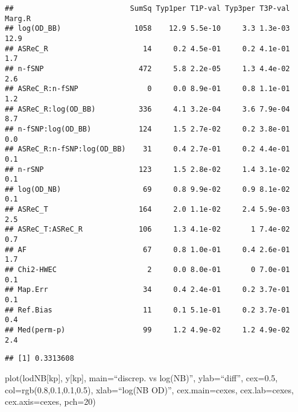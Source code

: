 \documentclass[]{article}
\newenvironment{Shaded}{\begin{snugshade}}{\end{snugshade}}
\newcommand{\KeywordTok}[1]{\textcolor[rgb]{0.13,0.29,0.53}{\textbf{#1}}}
\newcommand{\DataTypeTok}[1]{\textcolor[rgb]{0.13,0.29,0.53}{#1}}
\newcommand{\StringTok}[1]{\textcolor[rgb]{0.31,0.60,0.02}{#1}}
\newcommand{\OperatorTok}[1]{\textcolor[rgb]{0.81,0.36,0.00}{\textbf{#1}}}
\newcommand{\NormalTok}[1]{#1}
\begin{document}
\begin{verbatim}
##                           SumSq Typ1per T1P-val Typ3per T3P-val Marg.R
## log(OD_BB)                 1058    12.9 5.5e-10     3.3 1.3e-03   12.9
## ASReC_R                      14     0.2 4.5e-01     0.2 4.1e-01    1.7
## n-fSNP                      472     5.8 2.2e-05     1.3 4.4e-02    2.6
## ASReC_R:n-fSNP                0     0.0 8.9e-01     0.8 1.1e-01    1.2
## ASReC_R:log(OD_BB)          336     4.1 3.2e-04     3.6 7.9e-04    8.7
## n-fSNP:log(OD_BB)           124     1.5 2.7e-02     0.2 3.8e-01    0.0
## ASReC_R:n-fSNP:log(OD_BB)    31     0.4 2.7e-01     0.2 4.4e-01    0.1
## n-rSNP                      123     1.5 2.8e-02     1.4 3.1e-02    0.1
## log(OD_NB)                   69     0.8 9.9e-02     0.9 8.1e-02    0.1
## ASReC_T                     164     2.0 1.1e-02     2.4 5.9e-03    2.5
## ASReC_T:ASReC_R             106     1.3 4.1e-02       1 7.4e-02    0.7
## AF                           67     0.8 1.0e-01     0.4 2.6e-01    1.7
## Chi2-HWEC                     2     0.0 8.0e-01       0 7.0e-01    0.1
## Map.Err                      34     0.4 2.4e-01     0.2 3.7e-01    0.1
## Ref.Bias                     11     0.1 5.1e-01     0.2 3.7e-01    0.4
## Med(perm-p)                  99     1.2 4.9e-02     1.2 4.9e-02    2.4
\end{verbatim}

\begin{Shaded}
\end{Shaded}

\begin{verbatim}
## [1] 0.3313608
\end{verbatim}

\begin{Shaded}
\end{Shaded}

plot(lodNB{[}kp{]}, y{[}kp{]}, main=``discrep. vs log(NB)'',
ylab=``diff'', cex=0.5, col=rgb(0.8,0.1,0.1,0.5), xlab=``log(NB OD)'',
cex.main=cexes, cex.lab=cexes, cex.axis=cexes, pch=20)
\end{document}
